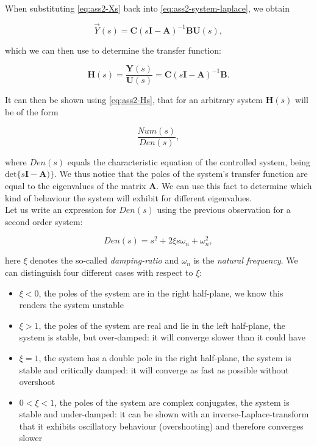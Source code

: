 \documentclass[11pt,titlepage]{report}
\begin{document}
When substituting \ref{eq:ass2-Xs} back into \ref{eq:ass2-system-laplace}, we obtain

\begin{equation*}
	\vec{Y}(s) = \mathbf{C}(s\mathbf{I} - \mathbf{A})^{-1}\mathbf{B}\mathbf{U}(s),
\end{equation*}

which we can then use to determine the transfer function:

\begin{equation}
	\mathbf{H}(s) = \frac{\mathbf{Y}(s)}{\mathbf{U}(s)} = \mathbf{C}(s\mathbf{I} - \mathbf{A})^{-1}\mathbf{B}.
	\label{eq:ass2-Hs}
\end{equation}

It can then be shown using \ref{eq:ass2-Hs}, that for an arbitrary system $\mathbf{H}(s)$ will be of the form

\begin{equation}
	\frac{Num(s)}{Den(s)},
\end{equation}

where $Den(s)$ equals the characteristic equation of the controlled system, being $\mathrm{det}\{s\mathbf{I}-\mathbf{A})\}$. We thus notice that the poles of the system's transfer function are equal to the eigenvalues of the matrix $\mathbf{A}$. We can use this fact to determine which kind of behaviour the system will exhibit for different eigenvalues. \\
Let us write an expression for $Den(s)$ using the previous observation for a second order system:

\begin{equation}
	Den(s) = s^2 + 2\xi s \omega_n + \omega_n^2,
\end{equation}

here $\xi$ denotes the so-called \textit{damping-ratio} and $\omega_n$ is the \textit{natural frequency}. We can distinguish four different cases with respect to $\xi$:

\begin{itemize}
	\item $\xi < 0$, the poles of the system are in the right half-plane, we know this renders the system unstable
	\item $\xi > 1$, the poles of the system are real and lie in the left half-plane, the system is stable, but over-damped: it will converge slower than it could have
	\item $\xi = 1$, the system has a double pole in the right half-plane, the system is stable and critically damped: it will converge as fast as possible without overshoot
	\item $0 < \xi < 1$, the poles of the system are complex conjugates, the system is stable and under-damped: it can be shown with an inverse-Laplace-transform that it exhibits oscillatory behaviour (overshooting) and therefore converges slower
\end{itemize}
\cite{transient-systems}
\end{document}
